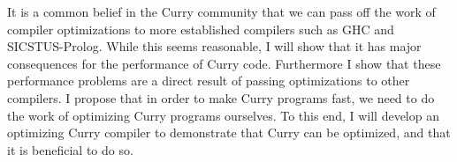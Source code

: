 It is a common belief in the Curry community that we can pass off the work of compiler optimizations
to more established compilers such as GHC and SICSTUS-Prolog.
While this seems reasonable, I will show that it has major consequences for the performance of Curry code.
Furthermore I show that these performance problems are a direct result of passing optimizations to other compilers.
I propose that in order to make Curry programs fast, we need to do the work of optimizing Curry programs ourselves.
To this end, I will develop an optimizing Curry compiler to demonstrate that Curry can be optimized, and that it is beneficial to do so.


